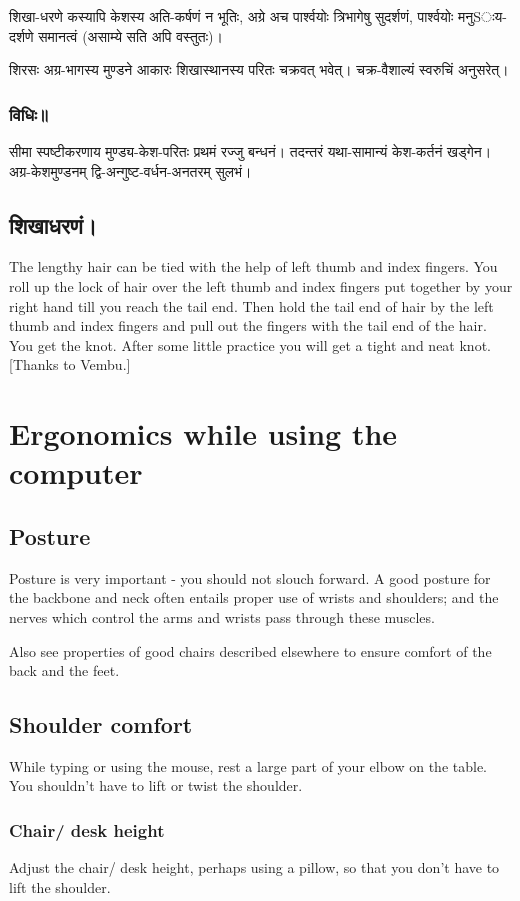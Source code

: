 \documentclass[oneside, article]{memoir}
\begin{document}
शिखा-धरणे कस्यापि केशस्य अति-कर्षणं न भूतिः, अग्रे अच पार्श्वयोः त्रिभागेषु सुदर्शणं, पार्श्वयोः मनुSःय-दर्शणे समानत्वं (असाम्ये सति अपि वस्तुतः)। 

शिरसः अग्र-भागस्य मुण्डने आकारः शिखास्थानस्य परितः चक्रवत् भवेत्। चक्र-वैशाल्यं स्वरुचिं अनुसरेत्।

\subsection{विधिः॥}
सीमा स्पष्टीकरणाय मुण्ड्य-केश-परितः प्रथमं रज्जु बन्धनं। तदन्तरं यथा-सामान्यं केश-कर्तनं खड्गेन।
अग्र-केशमुण्डनम् द्वि-अन्गुष्ट-वर्धन-अनतरम् सुलभं।

\section{शिखाधरणं।}


The lengthy hair can be tied with the help of left thumb and index fingers. You roll up the lock of hair over the left thumb and index fingers put together by your right hand till you reach the tail end. Then hold the tail end of hair by the left thumb and index fingers and pull out the fingers with the tail end of the hair. You get the knot. After some little practice you will get a tight and neat knot. [Thanks to Vembu.]

\chapter{Ergonomics while using the computer}
\section{Posture}
Posture is very important - you should not slouch forward. A good posture for the backbone and neck often entails proper use of wrists and shoulders; and the nerves which control the arms and wrists pass through these muscles.

Also see properties of good chairs described elsewhere to ensure comfort of the back and the feet.

\section{Shoulder comfort}
While typing or using the mouse, rest a large part of your elbow on the table. You shouldn't have to lift or twist the shoulder.

\subsection{Chair/ desk height}
Adjust the chair/ desk height, perhaps using a pillow, so that you don't have to lift the shoulder.
\end{document}
